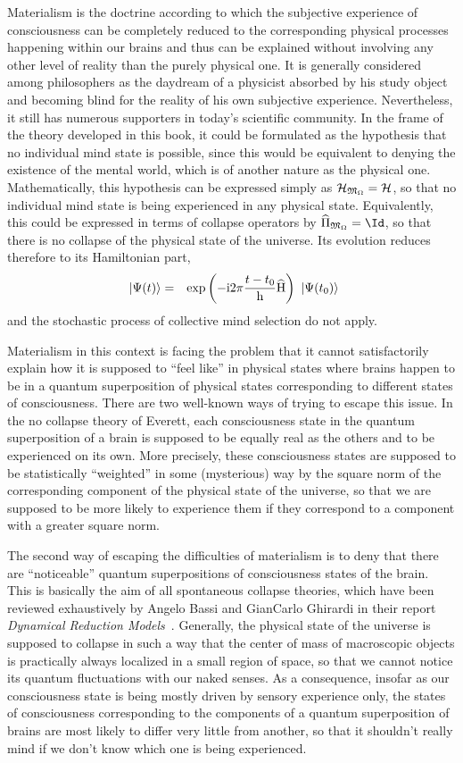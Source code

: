 \documentclass[10pt,a4paper,twoside,openany]{book}
\begin{document}
Materialism is the doctrine according to which the subjective experience of consciousness can be completely reduced to the corresponding physical processes happening within our brains and thus can be explained without involving any other level of reality than the purely physical one. It is generally considered among philosophers as the daydream of a physicist absorbed by his study object and becoming blind for the reality of his own subjective experience. Nevertheless, it still has numerous supporters in today's scientific community. In the frame of the theory developed in this book, it could be formulated as the hypothesis that no individual mind state is possible, since this would be equivalent to denying the existence of the mental world, which is of another nature as the physical one. Mathematically, this hypothesis can be expressed simply as $\mathcal H_{\mathfrak{M}_\Omega} = \mathcal H$, so that no individual mind state is being experienced in any physical state. Equivalently, this could be expressed in terms of collapse operators by $\op{\Pi}_{\cms_\vac} = \Id$, so that there is no collapse of the physical state of the universe. Its evolution reduces therefore to its Hamiltonian part,
\begin{eqnarray*}
\ \left|{\Psi(t)}\right\rangle & = & \mathrm{exp} \left( {- \mathrm{i} 2 \pi \frac{t - t_0} {\mathrm h} \widehat{\mathrm H}} \right) \ \left|{\Psi(t_0)}\right\rangle
\end{eqnarray*}
and the stochastic process of collective mind selection do not apply.

Materialism in this context is facing the problem that it cannot satisfactorily explain how it is supposed to ``feel like'' in physical states where brains happen to be in a quantum superposition of physical states corresponding to different states of consciousness. There are two well-known ways of trying to escape this issue. In the no collapse theory of Everett, each consciousness state in the quantum superposition of a brain is supposed to be equally real as the others and to be experienced on its own. More precisely, these consciousness states are supposed to be statistically ``weighted'' in some (mysterious) way by the square norm of the corresponding component of the physical state of the universe, so that we are supposed to be more likely to experience them if they correspond to a component with a greater square norm.

The second way of escaping the difficulties of materialism is to deny that there are ``noticeable'' quantum superpositions of consciousness states of the brain. This is basically the aim of all spontaneous collapse theories, which have been reviewed exhaustively by Angelo Bassi and GianCarlo Ghirardi in their report \textit{Dynamical Reduction Models}~\cite{Bassi2003}. Generally, the physical state of the universe is supposed to collapse in such a way that the center of mass of macroscopic objects is practically always localized in a small region of space, so that we cannot notice its quantum fluctuations with our naked senses. As a consequence, insofar as our consciousness state is being mostly driven by sensory experience only, the states of consciousness corresponding to the components of a quantum superposition of brains are most likely to differ very little from another, so that it shouldn't really mind if we don't know which one is being experienced.
\end{document}
